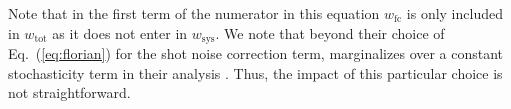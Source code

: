                                                                                                                                                                                                                                                                         Note that in the first term of the numerator in this equation $w_\mathrm{fc}$ is only 
                                                                                                                                                                                                                                                                        included in $w_\mathrm{tot}$ as it does not enter in $w_\mathrm{sys}$. 
                                                                                                                                                                                                                                                                        We note that beyond their choice of Eq.~(\ref{eq:florian}) 
                                                                                                                                                                                                                                                                        for the shot noise correction term, \cite{Beutler:2014aa} marginalizes over 
                                                                                                                                                                                                                                                                        a constant stochasticity term in their analysis \citep[see Eq.~40 in][]{Beutler:2014aa}.
                                                                                                                                                                                                                                                                        Thus, the impact of this particular choice is not straightforward. 
                                                                                                                                                                                                                                                                         

